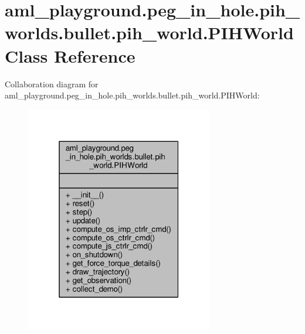\hypertarget{classaml__playground_1_1peg__in__hole_1_1pih__worlds_1_1bullet_1_1pih__world_1_1_p_i_h_world}{\section{aml\-\_\-playground.\-peg\-\_\-in\-\_\-hole.\-pih\-\_\-worlds.\-bullet.\-pih\-\_\-world.\-P\-I\-H\-World Class Reference}
\label{classaml__playground_1_1peg__in__hole_1_1pih__worlds_1_1bullet_1_1pih__world_1_1_p_i_h_world}
}


Collaboration diagram for aml\-\_\-playground.\-peg\-\_\-in\-\_\-hole.\-pih\-\_\-worlds.\-bullet.\-pih\-\_\-world.\-P\-I\-H\-World\-:\nopagebreak
\begin{figure}[H]
\begin{center}
\leavevmode
\includegraphics[width=232pt]{classaml__playground_1_1peg__in__hole_1_1pih__worlds_1_1bullet_1_1pih__world_1_1_p_i_h_world__coll__graph}
\end{center}
\end{figure}

